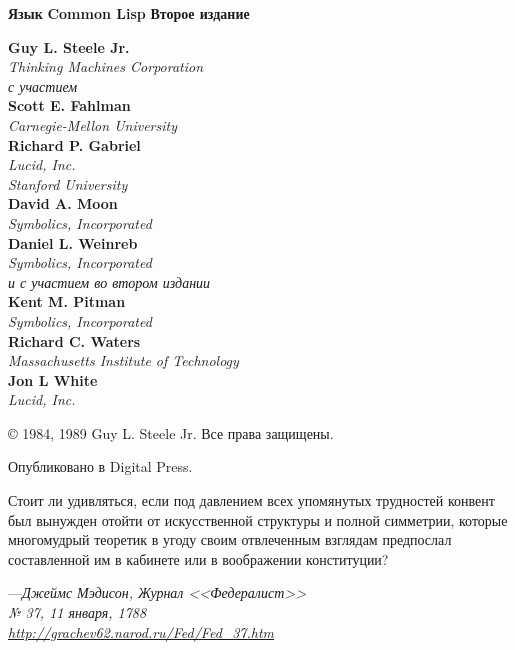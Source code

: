 \else

\begin{titlepage}

\noindent\textbf{Язык}
\noindent\textbf{Common Lisp}
\noindent\textbf{Второе издание}
\begin{flushleft}
\textbf{Guy L. Steele Jr.} \\
\emph{Thinking Machines Corporation} \\
\emph{с участием} \\
\textbf{Scott E. Fahlman} \\
\emph{Carnegie-Mellon University} \\
\textbf{Richard P. Gabriel} \\
\emph{Lucid, Inc.} \\
\emph{Stanford University} \\
\textbf{David A. Moon} \\
\emph{Symbolics, Incorporated} \\
\textbf{Daniel L. Weinreb} \\
\emph{Symbolics, Incorporated} \\
\emph{и с участием во втором издании} \\
\textbf{Kent M. Pitman} \\
\emph{Symbolics, Incorporated} \\
\textbf{Richard C. Waters} \\
\emph{Massachusetts Institute of Technology} \\
\textbf{Jon L White} \\
\emph{Lucid, Inc.}
\end{flushleft}

\begin{center}
\copyright{} 1984, 1989 Guy L. Steele Jr. Все права защищены.
\end{center}
\begin{flushright}
Опубликовано в Digital Press.
\end{flushright}

\end{titlepage}

\newpage 

Стоит ли удивляться, если под давлением всех упомянутых трудностей конвент был
вынужден отойти от искусственной структуры и полной симметрии, которые
многомудрый теоретик в угоду своим отвлеченным взглядам предпослал составленной
им в кабинете или в воображении конституции?
\begin{tabbing}
---\=\emph{Джеймс Мэдисон, Журнал <<Федералист>>} \\
\>\emph{№ 37, 11 января, 1788} \\
\>\emph{\href{http://grachev62.narod.ru/Fed/Fed\_37.htm}{http://grachev62.narod.ru/Fed/Fed\_37.htm}}
\end{tabbing}

\fi
